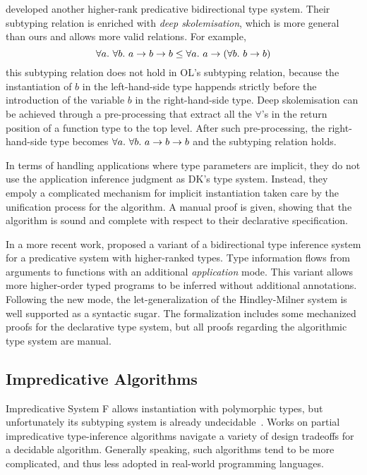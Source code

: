 \citet{jones2007practical} developed another higher-rank predicative bidirectional type system.
Their subtyping relation is enriched with \emph{deep skolemisation},
which is more general than ours and allows more valid relations.
For example,
$$\all{\all[b] a \to b \to b} \le \all a \to (\all[b] b \to b)$$
this subtyping relation does not hold in OL's subtyping relation,
because the instantiation of $b$ in the left-hand-side type
happends strictly before the introduction of
the variable $b$ in the right-hand-side type.
Deep skolemisation can be achieved through
a pre-processing that extract all the $\forall$'s
in the return position of a function type to the top level.
After such pre-processing, the right-hand-side type becomes
$\all {\all[b] a \to b \to b}$ and the subtyping relation holds.

In terms of handling applications where type parameters are implicit,
they do not use the application inference judgment as DK's type system.
Instead, they empoly a complicated mechanism for implicit instantiation
taken care by the unification process for the algorithm.
A manual proof is given, showing that the algorithm is sound and
complete with respect to their declarative specification.

In a more recent work, \citet{xie2018letarguments} proposed a variant of a
bidirectional type inference system for a predicative system with higher-ranked types.
Type information flows from arguments to
functions with an additional \emph{application} mode. This variant 
allows more higher-order typed programs to be inferred without additional annotations.
Following the new mode, the let-generalization of the Hindley-Milner system
is well supported as a syntactic sugar. The formalization includes some
mechanized proofs for the declarative type system, but all proofs regarding
the algorithmic type system are manual.

\subsection{Impredicative Algorithms}

Impredicative System F allows instantiation with polymorphic types,
but unfortunately its subtyping system is already undecidable~\citep{tiuryn1996subtyping}.
Works on partial impredicative type-inference algorithms
navigate a variety of design tradeoffs for a decidable algorithm.
Generally speaking, such algorithms tend to be more complicated,
and thus less adopted in real-world programming languages.

